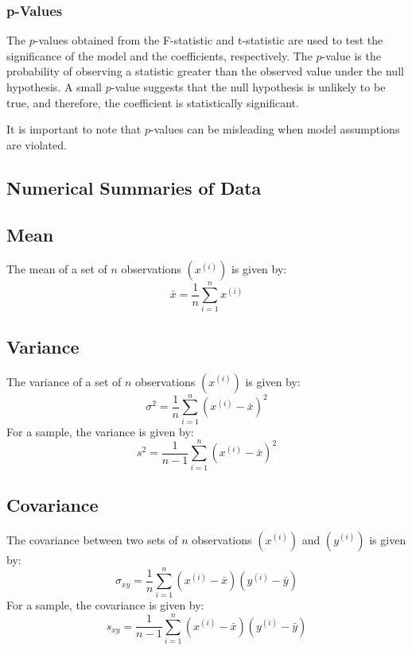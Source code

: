 \documentclass{article}
\begin{document}
\subsubsection{p-Values}
The \(p\)-values obtained from the F-statistic and t-statistic are
used to test the significance of the model and the coefficients,
respectively. The \(p\)-value is the probability of observing a
statistic greater than the observed value under the null hypothesis.
A small \(p\)-value suggests that the null hypothesis is unlikely to
be true, and therefore, the coefficient is statistically significant.

It is important to note that \(p\)-values can be misleading when model
assumptions are violated.
\newpage
\begin{appendix}
    \section{Numerical Summaries of Data}\label{appendix:numerical-summaries}
    \subsection{Mean}
    The mean of a set of \(n\) observations \(\left( x^{\left( i
    \right)} \right)\) is given by:
    \begin{equation*}
        \bar{x} = \frac{1}{n} \sum_{i = 1}^n x^{\left( i \right)}
    \end{equation*}
    \subsection{Variance}
    The variance of a set of \(n\) observations \(\left( x^{\left( i
    \right)} \right)\) is given by:
    \begin{equation*}
        \sigma^2 = \frac{1}{n} \sum_{i = 1}^n {\left( x^{\left( i \right)} - \bar{x} \right)}^2
    \end{equation*}
    For a sample, the variance is given by:
    \begin{equation*}
        s^2 = \frac{1}{n - 1} \sum_{i = 1}^n {\left( x^{\left( i \right)} - \bar{x} \right)}^2
    \end{equation*}
    \subsection{Covariance}
    The covariance between two sets of \(n\) observations \(\left(
    x^{\left( i \right)} \right)\) and \(\left( y^{\left( i \right)}
    \right)\) is given by:
    \begin{equation*}
        \sigma_{xy} = \frac{1}{n} \sum_{i = 1}^n \left( x^{\left( i \right)} - \bar{x} \right) \left( y^{\left( i \right)} - \bar{y} \right)
    \end{equation*}
    For a sample, the covariance is given by:
    \begin{equation*}
        s_{xy} = \frac{1}{n - 1} \sum_{i = 1}^n \left( x^{\left( i \right)} - \bar{x} \right) \left( y^{\left( i \right)} - \bar{y} \right)
    \end{equation*}
\end{appendix}
\end{document}
